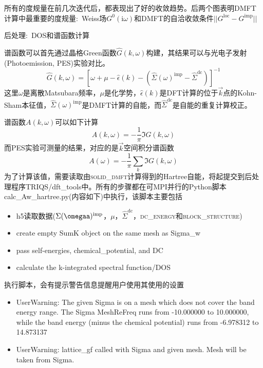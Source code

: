 所有的度规量在前几次迭代后，都表现出了好的收敛趋势。后两个图表明\textrm{DMFT}计算中最重要的度规量:~\textrm{Weiss}场$G^0(\mathrm{i}\omega)$和\textrm{DMFT}的自洽收敛条件$||G^{\mathrm{loc}}-G^{\mathrm{imp}}||$

后处理:~\textrm{DOS}和谱函数计算

谱函数可以首先通过晶格\textrm{Green}函数$\hat{G}(k,\omega)$构建，其结果可以与光电子发射\textrm{(Photoemission, PES)}实验对比。
\begin{displaymath}
	\hat{G}(k,\omega)=\left[ \omega+\mu-\hat{\epsilon}(k)-\left( \hat{\Sigma}(\omega)^{\mathrm{imp}}-\hat{\Sigma}^{\mathrm{dc}} \right) \right]^{-1}
\end{displaymath}
这里$\omega$是离散\textrm{Matsubara}频率，$\mu$是化学势，$\hat{\epsilon}(k)$是\textrm{DFT}计算的位于$\vec k$点的\textrm{Kohn-Sham}本征值，$\hat{\Sigma}(\omega)^{\mathrm{imp}}$是\textrm{DMFT}计算的自能，而$\hat{\Sigma}^{\mathrm{dc}}$是自能的重复计算校正。

谱函数$A(k,\omega)$可以如下计算
\begin{displaymath}
	A(k,\omega)=-\dfrac1{\pi}\Im G(k,\omega)
\end{displaymath}
而\textrm{PES}实验可测量的结果，对应的是$\vec k$空间积分谱函数
\begin{displaymath}
	A(\omega)=-\dfrac1{\pi}\sum_k\Im G(k,\omega)
\end{displaymath}
为了计算该值，需要读取由\textsc{solid\_dmft}计算得到的\textrm{Hartree}自能，将起提交到后处理程序\textrm{TRIQS/dft\_tools}中。所有的步骤都在可\textrm{MPI}并行的\textrm{Python}脚本\textrm{calc\_Aw\_hartree.py}(内容如下)中执行，该脚本主要包括
\begin{itemize}
	\item \textrm{h5}读取数据($\Sigma(\omegaa)^{\mathrm{imp}}$，$\mu$，$\hat{\Sigma}^{\mathrm{dc}}$，\textsc{dc\_energy}和\textsc{block\_structure})
	\item \textrm{create empty SumK object on the same mesh as Sigma\_w}
	\item \textrm{pass self-energies, chemical\_potential, and DC}
	\item \textrm{calculate the k-integrated spectral function/DOS} 
\end{itemize}
执行脚本，会有提示警告信息提醒用户使用其使用的设置
\begin{itemize}
	\item \textrm{UserWarning: The given Sigma is on a mesh which does not cover the band energy range. The Sigma MeshReFreq runs from -10.000000 to 10.000000, while the band energy (minus the chemical potential) runs from -6.978312 to 14.873137}
	\item \textrm{UserWarning: lattice\_gf called with Sigma and given mesh. Mesh will be taken from Sigma.}
\end{itemize}

